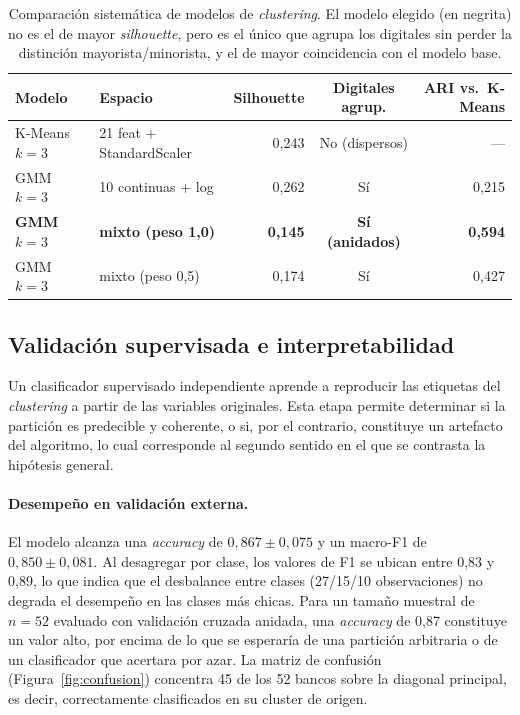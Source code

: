 \documentclass[11pt,a4paper]{article}
\begin{document}
\begin{table}[htbp]
\centering
\caption{Comparación sistemática de modelos de \textit{clustering}. El modelo elegido (en negrita) no es el
de mayor \textit{silhouette}, pero es el único que agrupa los digitales sin perder la distinción
mayorista/minorista, y el de mayor coincidencia con el modelo base.}
\label{tab:modelos}
\small
\begin{tabular}{llrcr}
\toprule
\textbf{Modelo} & \textbf{Espacio} & \textbf{Silhouette} & \textbf{Digitales agrup.} & \textbf{ARI vs.\ K-Means} \\
\midrule
K-Means $k=3$ & 21 feat + StandardScaler & 0,243 & No (dispersos) & --- \\
GMM $k=3$ & 10 continuas + log & 0,262 & Sí & 0,215 \\
\textbf{GMM $k=3$} & \textbf{mixto (peso 1,0)} & \textbf{0,145} & \textbf{Sí (anidados)} & \textbf{0,594} \\
GMM $k=3$ & mixto (peso 0,5) & 0,174 & Sí & 0,427 \\
\bottomrule
\end{tabular}
\end{table}

\subsection{Validación supervisada e interpretabilidad}
\label{sec:res2}

Un clasificador supervisado independiente aprende a reproducir las etiquetas del \textit{clustering} a
partir de las variables originales. Esta etapa permite determinar si la partición es predecible y
coherente, o si, por el contrario, constituye un artefacto del algoritmo, lo cual corresponde al segundo
sentido en el que se contrasta la hipótesis general.

\paragraph{Desempeño en validación externa.} El modelo alcanza una \textit{accuracy} de $0{,}867 \pm 0{,}075$
y un macro-F1 de $0{,}850 \pm 0{,}081$. Al desagregar por clase, los valores de F1 se ubican entre 0,83 y
0,89, lo que indica que el desbalance entre clases (27/15/10 observaciones) no degrada el desempeño en las
clases más chicas. Para un tamaño muestral de $n = 52$ evaluado con validación cruzada anidada, una
\textit{accuracy} de 0,87 constituye un valor alto, por encima de lo que se esperaría de una partición
arbitraria o de un clasificador que acertara por azar. La matriz de confusión (Figura~\ref{fig:confusion})
concentra 45 de los 52 bancos sobre la diagonal principal, es decir, correctamente clasificados en su
cluster de origen.
\end{document}
